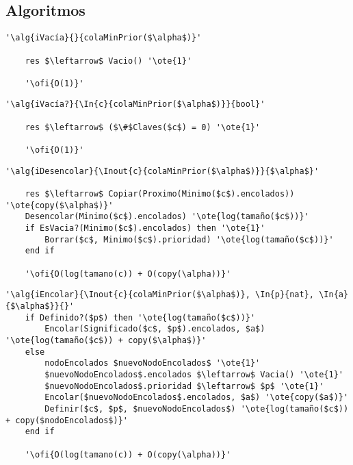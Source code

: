 \subsection{Algoritmos}
	\lstset{style=alg}

	\begin{lstlisting}[mathescape]
	'\alg{iVacía}{}{colaMinPrior($\alpha$)}'

	res $\leftarrow$ Vacio() '\ote{1}'

	'\ofi{O(1)}'
	\end{lstlisting}

	\begin{lstlisting}[mathescape]
	'\alg{iVacía?}{\In{c}{colaMinPrior($\alpha$)}}{bool}'

	res $\leftarrow$ ($\#$Claves($c$) = 0) '\ote{1}'

	'\ofi{O(1)}'
	\end{lstlisting}

	\begin{lstlisting}[mathescape]
	'\alg{iDesencolar}{\Inout{c}{colaMinPrior($\alpha$)}}{$\alpha$}'

	res $\leftarrow$ Copiar(Proximo(Minimo($c$).encolados)) '\ote{copy($\alpha$)}'
	Desencolar(Minimo($c$).encolados) '\ote{log(tamaño($c$))}'
	if EsVacia?(Minimo($c$).encolados) then '\ote{1}'
		Borrar($c$, Minimo($c$).prioridad) '\ote{log(tamaño($c$))}'
	end if

	'\ofi{O(log(tamano(c)) + O(copy(\alpha))}'
	\end{lstlisting}

	\begin{lstlisting}[mathescape]
	'\alg{iEncolar}{\Inout{c}{colaMinPrior($\alpha$)}, \In{p}{nat}, \In{a}{$\alpha$}}{}'
	if Definido?($p$) then '\ote{log(tamaño($c$))}'
		Encolar(Significado($c$, $p$).encolados, $a$) '\ote{log(tamaño($c$)) + copy($\alpha$)}'
	else
		nodoEncolados $nuevoNodoEncolados$ '\ote{1}'
		$nuevoNodoEncolados$.encolados $\leftarrow$ Vacia() '\ote{1}'
		$nuevoNodoEncolados$.prioridad $\leftarrow$ $p$ '\ote{1}'
		Encolar($nuevoNodoEncolados$.encolados, $a$) '\ote{copy($a$)}'
		Definir($c$, $p$, $nuevoNodoEncolados$) '\ote{log(tamaño($c$)) + copy($nodoEncolados$)}'
	end if

	'\ofi{O(log(tamano(c)) + O(copy(\alpha))}'
	\end{lstlisting}

